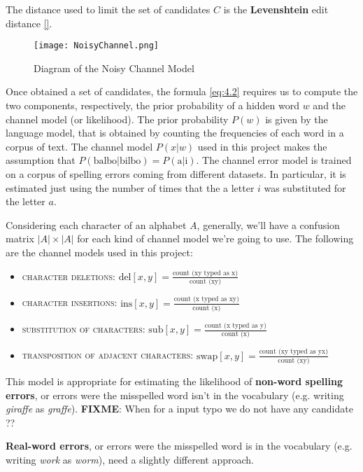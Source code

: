 The distance used to limit the set of candidates $C$ is the \textbf{Levenshtein} edit distance \ref{}.	

\begin{figure}[H]
	\centering
	\texttt{[image: NoisyChannel.png]}
	\caption{Diagram of the Noisy Channel Model}
	\label{fig:noisychannel}
\end{figure}

Once obtained a set of candidates, the formula \ref{eq:4.2} requires us to compute the two components, 
respectively, the prior probability of a hidden word $w$ and the channel model (or likelihood).
The prior probability $P(w)$ is given by the language model, that is obtained by counting the frequencies of 
each word in a corpus of text.  
The channel model $P(x|w)$ used in this project makes the assumption that $P(\mbox{balbo}|\mbox{bilbo}) = 
P(\mbox{a}|\mbox{i})$. The channel error model is trained on a corpus of spelling errors coming from different 
datasets. In particular, it is estimated just using the number of times that the a letter $i$ was substituted for the 
letter $a$. 

Considering each character of an alphabet $A$, generally, we'll have a confusion matrix $|A|\times|A|$ for each 
kind of channel model we're going to use. The following are the channel models used in this project:
\begin{itemize}
	\item \textsc{character deletions}: $\mbox{del}[x, y] = \frac{\mbox{count (xy  typed as x)}} 
	{\mbox{count (xy)}}$
	\item \textsc{character insertions}: $\mbox{ins}[x, y] = \frac{\mbox{count (x  typed as xy)}} 
	{\mbox{count (x)}}$
	\item \textsc{substitution of characters}: $\mbox{sub}[x, y] = \frac{\mbox{count (x  typed as y)}} 
	{\mbox{count (x)}}$
	\item \textsc{transposition of adjacent characters}: $\mbox{swap}[x, y] = \frac{\mbox{count (xy  typed as 
	yx)}} 
	{\mbox{count (xy)}}$
\end{itemize}


This model is appropriate for estimating the likelihood of \textbf{non-word spelling errors}, or errors were the 
misspelled word isn't in the vocabulary (e.g. writing \textsl{giraffe} as \textsl{graffe}).
\textbf{FIXME}: When for a input typo we do not have any candidate ?? 

\textbf{Real-word errors}, or errors were the misspelled word is in the vocabulary (e.g. writing \textsl{work}  as  
\textsl{worm}), need a slightly different approach.

